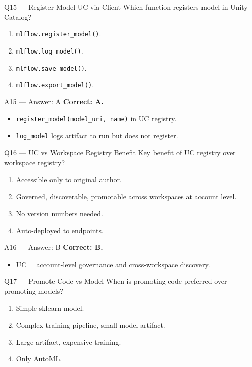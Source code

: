 \documentclass[aspectratio=169,9pt]{beamer}
\begin{document}
	\begin{frame}{Q15 — Register Model UC via Client}
		Which function registers model in Unity Catalog?
		\begin{enumerate}[label=\Alph*.]
			\item \texttt{mlflow.register\_model()}.
			\item \texttt{mlflow.log\_model()}.
			\item \texttt{mlflow.save\_model()}.
			\item \texttt{mlflow.export\_model()}.
		\end{enumerate}
	\end{frame}
	
	\begin{frame}{A15 — Answer: A}
		\textbf{Correct: A.}
		\begin{itemize}
			\item \texttt{register\_model(model\_uri, name)} in UC registry.
			\item \texttt{log\_model} logs artifact to run but does not register.
		\end{itemize}
	\end{frame}
	
	\begin{frame}{Q16 — UC vs Workspace Registry Benefit}
		Key benefit of UC registry over workspace registry?
		\begin{enumerate}[label=\Alph*.]
			\item Accessible only to original author.
			\item Governed, discoverable, promotable across workspaces at account level.
			\item No version numbers needed.
			\item Auto-deployed to endpoints.
		\end{enumerate}
	\end{frame}
	
	\begin{frame}{A16 — Answer: B}
		\textbf{Correct: B.}
		\begin{itemize}
			\item UC = account-level governance and cross-workspace discovery.
		\end{itemize}
	\end{frame}
	
	\begin{frame}{Q17 — Promote Code vs Model}
		When is promoting code preferred over promoting models?
		\begin{enumerate}[label=\Alph*.]
			\item Simple sklearn model.
			\item Complex training pipeline, small model artifact.
			\item Large artifact, expensive training.
			\item Only AutoML.
		\end{enumerate}
	\end{frame}
	
\end{document}
